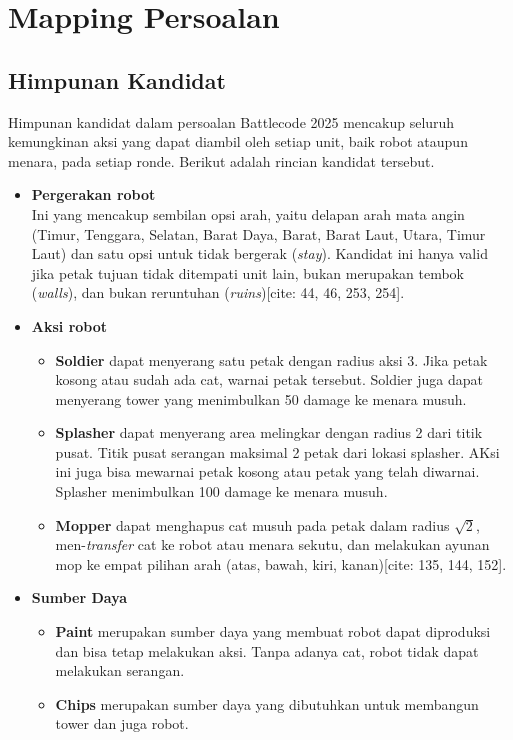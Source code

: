 \section{Mapping Persoalan}
\subsection{Himpunan Kandidat}

Himpunan kandidat dalam persoalan Battlecode 2025 mencakup seluruh kemungkinan aksi yang dapat diambil oleh setiap unit, baik robot ataupun menara, pada setiap ronde. Berikut adalah rincian kandidat tersebut.

\begin{itemize}
    \item \textbf{Pergerakan robot}\\
          Ini yang mencakup sembilan opsi arah, yaitu delapan arah mata angin (Timur, Tenggara, Selatan, Barat Daya, Barat, Barat Laut, Utara, Timur Laut) dan satu opsi untuk tidak bergerak (\textit{stay}). Kandidat ini hanya valid jika petak tujuan tidak ditempati unit lain, bukan merupakan tembok (\textit{walls}), dan bukan reruntuhan (\textit{ruins})[cite: 44, 46, 253, 254].

    \item \textbf{Aksi robot}
          \begin{itemize}
              \item \textbf{Soldier} dapat menyerang satu petak dengan radius aksi 3. Jika petak kosong atau sudah ada cat, warnai petak tersebut. Soldier juga dapat menyerang tower yang menimbulkan 50 damage ke menara musuh.
              \item \textbf{Splasher} dapat menyerang area melingkar dengan radius 2 dari titik pusat. Titik pusat serangan maksimal 2 petak dari lokasi splasher. AKsi ini juga bisa mewarnai petak kosong atau petak yang telah diwarnai. Splasher menimbulkan 100 damage ke menara musuh.
              \item \textbf{Mopper} dapat menghapus cat musuh pada petak dalam radius $\sqrt{2}$, men-\textit{transfer} cat ke robot atau menara sekutu, dan melakukan ayunan mop ke empat pilihan arah (atas, bawah, kiri, kanan)[cite: 135, 144, 152].
          \end{itemize}

    \item \textbf{Sumber Daya}
          \begin{itemize}
              \item \textbf{Paint} merupakan sumber daya yang membuat robot dapat diproduksi dan bisa tetap melakukan aksi. Tanpa adanya cat, robot tidak dapat melakukan serangan.
              \item \textbf{Chips} merupakan sumber daya yang dibutuhkan untuk membangun tower dan juga robot.
          \end{itemize}


\end{itemize}
